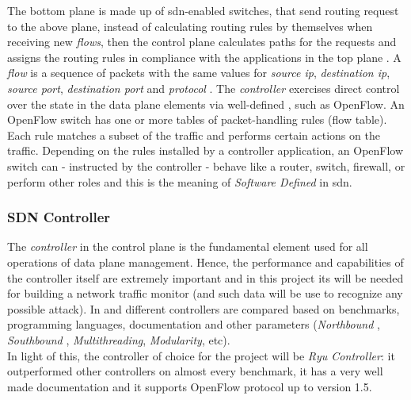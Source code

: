 The bottom plane is made up of \gls{sdn}-enabled switches, that send routing request to the above plane, instead of calculating routing rules by themselves when receiving new \textit{flows}, then the control plane calculates paths for the requests and assigns the routing rules in compliance with the applications in the top plane \cite{Xu2017}. A \textit{flow} is a sequence of packets with the same values for \textit{source ip}, \textit{destination ip}, \textit{source port}, \textit{destination port} and \textit{protocol} \cite{icissp17}. The \textit{controller} exercises direct control over the state in the data plane elements via well-defined , such as OpenFlow. An OpenFlow switch has one or more tables of packet-handling rules (flow table). Each rule matches a subset of the traffic and performs certain actions on the traffic. Depending on the rules installed by a controller application, an OpenFlow switch can - instructed by the controller - behave like a router, switch, firewall, or perform other roles and this is the meaning of \textit{Software Defined} in \gls{sdn}.


\subsubsection{SDN Controller}
\label{ssubsec:sdn-controller}

The \textit{controller} in the control plane is the fundamental element used for all operations of data plane management. Hence, the performance and capabilities of the controller itself are extremely important and in this project its  will be needed for building a network traffic monitor (and such data will be use to recognize any possible attack). In \cite{Bondkovskii2016} and \cite{Zhu2019} different controllers are compared based on benchmarks, programming languages, documentation and other parameters (\textit{Northbound }, \textit{Southbound }, \textit{Multithreading}, \textit{Modularity}, etc). \\ In light of this, the controller of choice for the project will be \textit{Ryu Controller}: it outperformed other controllers on almost every benchmark, it has a very well made documentation \cite{RyuDoc} and it supports OpenFlow protocol up to version 1.5.

